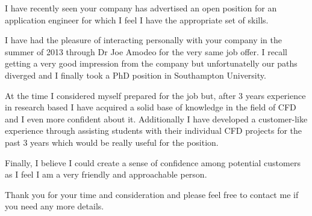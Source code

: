 \documentclass[10pt,stdletter,dateno,sigleft]{newlfm} %
\begin{document}
\begin{newlfm}


I have recently seen your company has advertised an open position for an application
engineer for which I feel I have the appropriate set of skills.

I have had the pleasure of interacting personally with your company in the summer of 2013 through Dr
Joe Amodeo for the very same job offer. I recall getting a very good impression from the
company but unfortunatelly our paths diverged and I finally took a PhD position in
Southampton University.

At the time I considered myself prepared for the job but, after 3 years experience in
research based I have acquired a solid base of knowledge in the field of CFD and I even
more confident about it. Additionally I have developed a customer-like experience through
assisting students with their individual CFD projects for the past 3 years which would be
really useful for the position.

Finally, I believe I could create a sense of confidence among potential customers
as I feel I am a very friendly and approachable person.

Thank you for your time and consideration and please feel free to contact me if you need
any more details.

\end{newlfm}
\end{document}
